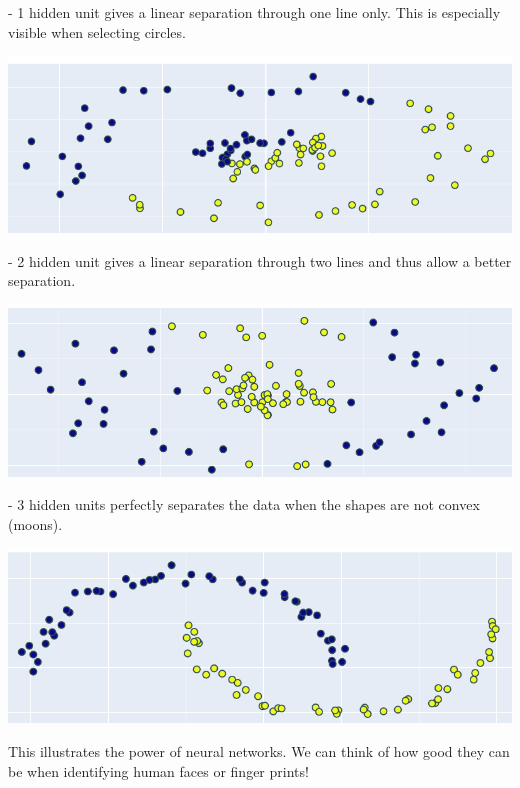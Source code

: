 - 1 hidden unit gives a linear separation through one line only. This is especially visible when selecting circles. \\

\begin{center}
\includegraphics[scale=0.3]{img/1-hu-linear.png}
\end{center}

- 2 hidden unit gives a linear separation through two lines and thus allow a better separation. \\

\begin{center}
\includegraphics[scale=0.3]{img/2-hu-linear.png}
\end{center}

- 3 hidden units perfectly separates the data when the shapes are not convex (moons).

\begin{center}
\includegraphics[scale=0.3]{img/3-hu-moons.png}
\end{center}

This illustrates the power of neural networks. We can think of how good they can be when identifying human faces or finger prints!

